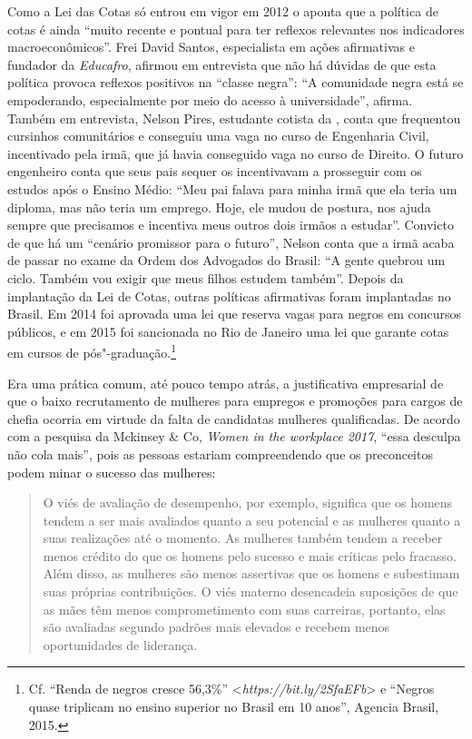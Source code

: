 Como a Lei das Cotas só entrou em vigor em 2012 o  aponta que a
política de cotas é ainda ``muito recente e pontual para ter reflexos
relevantes nos indicadores macroeconômicos''. Frei David Santos,
especialista em ações afirmativas e fundador da \emph{ Educafro},
afirmou em entrevista que não há dúvidas de que esta política provoca
reflexos positivos na ``classe negra'': ``A comunidade negra está se
empoderando, especialmente por meio do acesso à universidade'', afirma.
Também em entrevista, Nelson Pires, estudante cotista da , conta que
frequentou cursinhos comunitários e conseguiu uma vaga no curso de
Engenharia Civil, incentivado pela irmã, que já havia conseguido vaga no
curso de Direito. O futuro engenheiro conta que seus pais sequer os
incentivavam a prosseguir com os estudos após o Ensino Médio: ``Meu pai
falava para minha irmã que ela teria um diploma, mas não teria um
emprego. Hoje, ele mudou de postura, nos ajuda sempre que precisamos e
incentiva meus outros dois irmãos a estudar''. Convicto de que há um
``cenário promissor para o futuro'', Nelson conta que a irmã acaba de
passar no exame da Ordem dos Advogados do Brasil: ``A gente quebrou um
ciclo. Também vou exigir que meus filhos estudem também''. Depois da
implantação da Lei de Cotas, outras políticas afirmativas foram
implantadas no Brasil. Em 2014 foi aprovada uma lei que reserva vagas
para negros em concursos públicos, e em 2015 foi sancionada no Rio de
Janeiro uma lei que garante cotas em cursos de pós"-graduação.\footnote{Cf.
  ``Renda de negros cresce 56,3\%''
  \textless{}\emph{https://bit.ly/2SfaEFb}\textgreater{}
  e ``Negros quase triplicam no ensino superior no Brasil em 10 anos'',
  Agencia Brasil, 2015.}

Era uma prática comum, até pouco tempo atrás, a justificativa
empresarial de que o baixo recrutamento de mulheres para empregos e
promoções para cargos de chefia ocorria em virtude da falta de
candidatas mulheres qualificadas. De acordo com a pesquisa da Mckinsey
\& Co, \emph{Women in the workplace 2017}, ``essa desculpa não cola
mais'', pois as pessoas estariam compreendendo que os preconceitos podem
minar o sucesso das mulheres:

\begin{quote}
O viés de avaliação de desempenho, por exemplo, significa que os homens
tendem a ser mais avaliados quanto a seu potencial e as mulheres quanto
a suas realizações até o momento. As mulheres também tendem a receber
menos crédito do que os homens pelo sucesso e mais críticas pelo
fracasso. Além disso, as mulheres são menos assertivas que os homens e
subestimam suas próprias contribuições. O viés materno desencadeia
suposições de que as mães têm menos comprometimento com suas carreiras,
portanto, elas são avaliadas segundo padrões mais elevados e recebem
menos oportunidades de liderança.
\end{quote}

